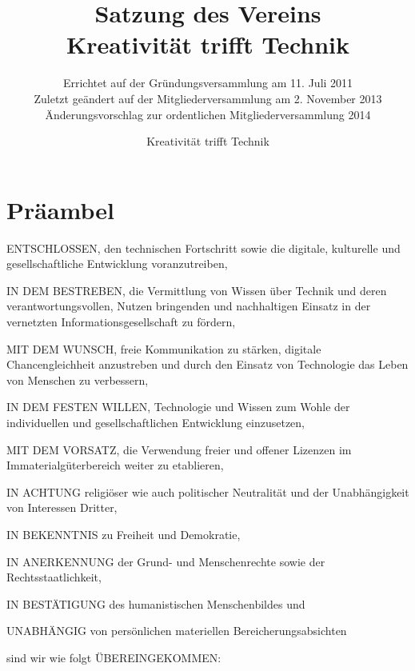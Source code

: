 \documentclass[a4paper,10pt]{scrreprt}
\begin{document}
\title{Satzung des Vereins\\Kreativität trifft Technik}
\subtitle{
	Errichtet auf der Gründungsversammlung am 11. Juli 2011\\
	Zuletzt geändert auf der Mitgliederversammlung am 2. November 2013\\
	Änderungsvorschlag zur ordentlichen Mitgliederversammlung 2014
}
\author{Kreativität trifft Technik}



\section*{Präambel}

ENTSCHLOSSEN, den technischen Fortschritt sowie die digitale, kulturelle und
gesellschaftliche Entwicklung voranzutreiben,

IN DEM BESTREBEN, die Vermittlung von Wissen über Technik und deren
verantwortungsvollen, Nutzen bringenden und nachhaltigen Einsatz in der
vernetzten Informationsgesellschaft zu fördern,

MIT DEM WUNSCH, freie Kommunikation zu stärken, digitale Chancengleichheit
anzustreben und durch den Einsatz von Technologie das Leben von Menschen zu
verbessern,

IN DEM FESTEN WILLEN, Technologie und Wissen zum Wohle der individuellen und
gesellschaftlichen Entwicklung einzusetzen,

MIT DEM VORSATZ, die Verwendung freier und offener Lizenzen im
Immaterialgüterbereich weiter zu etablieren,

IN ACHTUNG religiöser wie auch politischer Neutralität und der Unabhängigkeit
von Interessen Dritter,

IN BEKENNTNIS zu Freiheit und Demokratie,

IN ANERKENNUNG der Grund- und Menschenrechte sowie der Rechtsstaatlichkeit,

IN BESTÄTIGUNG des humanistischen Menschenbildes und

UNABHÄNGIG von persönlichen materiellen Bereicherungsabsichten

sind wir wie folgt ÜBEREINGEKOMMEN:

\newpage
\end{document}
